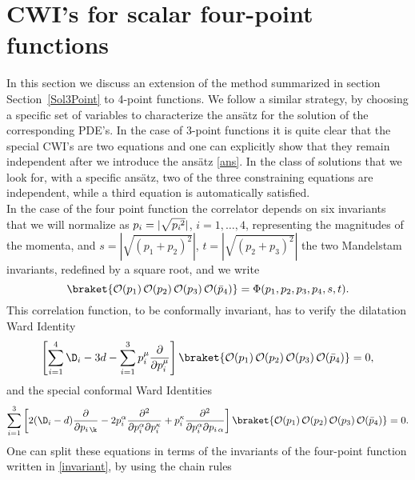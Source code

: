 \documentclass[a4paper,11pt,openright,twoside]{book}
\newcommand{\secref}[1]{Section~\ref{#1}}		%
\numberwithin{equation}{section}
\begin{document}
{%
\section{CWI's for scalar four-point functions}
In this section we discuss an extension of the method summarized in section \secref{Sol3Point} to 4-point functions. We follow a similar strategy, by choosing a specific set of variables to characterize the ans\"atz for the solution of the corresponding PDE's. In the case of 3-point functions it is quite clear that the special CWI's are two equations and one can explicitly show that they remain independent after we introduce the ans\"atz \eqref{ans}. In the class of solutions that we look for, with a specific ans\"atz, two of the three constraining equations are independent, while a third equation is automatically satisfied.\\
In the case of the four point function the correlator depends on six invariants that we will normalize as
$p_i=|\sqrt{p_{i}\,{\hspace{-0.09cm}}^2}|$, $i=1,\dots,4$, representing the magnitudes of the momenta, and $s=|\sqrt{(p_1+p_2)^2}|$, $t=|\sqrt{(p_2+p_3)^2}|$ the two Mandelstam invariants, redefined by a square root, and we write
\begin{equation}
	\braket{\mathcal{O}(p_1)\,\mathcal{O}(p_2)\,\mathcal{O}(p_3)\,\mathcal{O}(\bar{p}_4)}=\Phi(p_1,p_2,p_3,p_4,s,t).\label{invariant}
\end{equation}
This correlation function, to be conformally invariant, has to verify the dilatation Ward Identity
\begin{equation}
	\left[\sum_{i=1}^4\D_i-3d-\sum_{i = 1}^3p_i^{\mu}\frac{\partial}{\partial p_i^\mu}\right]\braket{\mathcal{O}(p_1)\,\mathcal{O}(p_2)\,\mathcal{O}(p_3)\,\mathcal{O}(\bar{p}_4)}=0,
\end{equation}
and the special conformal Ward Identities
\begin{equation}
	\sum_{i=1}^3\left[2(\D_i-d)\frac{\partial}{\partial p_{i\,\k}}-2p_i^\alpha\frac{\partial^2}{\partial p_i^\alpha\partial p_i^\kappa}+p_i^\kappa\frac{\partial^2}{\partial p_i^\alpha\partial p_{i\,\alpha}}\right]\braket{\mathcal{O}(p_1)\,\mathcal{O}(p_2)\,\mathcal{O}(p_3)\,\mathcal{O}(\bar{p}_4)}=0.
\end{equation}
One can split these equations in terms of the invariants of the four-point function written in \eqref{invariant}, by using the chain rules
}
\end{document}
